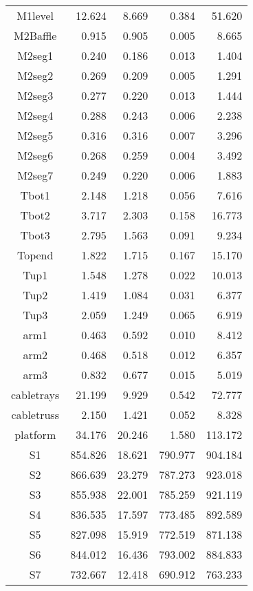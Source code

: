 \begin{longtable}{crrrr}
 M1level & 12.624 & 8.669 & 0.384 & 51.620 \\
 M2Baffle & 0.915 & 0.905 & 0.005 & 8.665 \\
 M2seg1 & 0.240 & 0.186 & 0.013 & 1.404 \\
 M2seg2 & 0.269 & 0.209 & 0.005 & 1.291 \\
 M2seg3 & 0.277 & 0.220 & 0.013 & 1.444 \\
 M2seg4 & 0.288 & 0.243 & 0.006 & 2.238 \\
 M2seg5 & 0.316 & 0.316 & 0.007 & 3.296 \\
 M2seg6 & 0.268 & 0.259 & 0.004 & 3.492 \\
 M2seg7 & 0.249 & 0.220 & 0.006 & 1.883 \\
 Tbot1 & 2.148 & 1.218 & 0.056 & 7.616 \\
 Tbot2 & 3.717 & 2.303 & 0.158 & 16.773 \\
 Tbot3 & 2.795 & 1.563 & 0.091 & 9.234 \\
 Topend & 1.822 & 1.715 & 0.167 & 15.170 \\
 Tup1 & 1.548 & 1.278 & 0.022 & 10.013 \\
 Tup2 & 1.419 & 1.084 & 0.031 & 6.377 \\
 Tup3 & 2.059 & 1.249 & 0.065 & 6.919 \\
 arm1 & 0.463 & 0.592 & 0.010 & 8.412 \\
 arm2 & 0.468 & 0.518 & 0.012 & 6.357 \\
 arm3 & 0.832 & 0.677 & 0.015 & 5.019 \\
 cabletrays & 21.199 & 9.929 & 0.542 & 72.777 \\
 cabletruss & 2.150 & 1.421 & 0.052 & 8.328 \\
 platform & 34.176 & 20.246 & 1.580 & 113.172 \\
 S1 & 854.826 & 18.621 & 790.977 & 904.184 \\
 S2 & 866.639 & 23.279 & 787.273 & 923.018 \\
 S3 & 855.938 & 22.001 & 785.259 & 921.119 \\
 S4 & 836.535 & 17.597 & 773.485 & 892.589 \\
 S5 & 827.098 & 15.919 & 772.519 & 871.138 \\
 S6 & 844.012 & 16.436 & 793.002 & 884.833 \\
 S7 & 732.667 & 12.418 & 690.912 & 763.233 \\
\bottomrule
\end{longtable}

